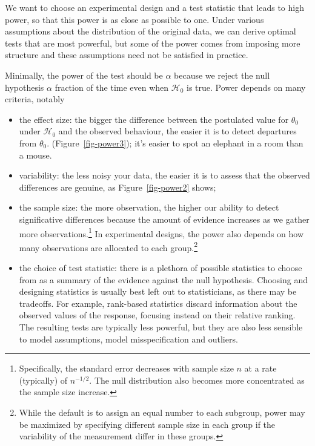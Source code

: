 \documentclass[
  11pt,
  letterpaper,
]{scrbook}
\providecommand{\tightlist}{%
  \setlength{\itemsep}{0pt}\setlength{\parskip}{0pt}}\usepackage{longtable,booktabs,array}
\theoremstyle{definition}
\theoremstyle{remark}
\begin{document}
We want to choose an experimental design and a test statistic that leads
to high power, so that this power is as close as possible to one. Under
various assumptions about the distribution of the original data, we can
derive optimal tests that are most powerful, but some of the power comes
from imposing more structure and these assumptions need not be satisfied
in practice.

Minimally, the power of the test should be \(\alpha\) because we reject
the null hypothesis \(\alpha\) fraction of the time even when
\(\mathscr{H}_0\) is true. Power depends on many criteria, notably

\begin{itemize}
\tightlist
\item
  the effect size: the bigger the difference between the postulated
  value for \(\theta_0\) under \(\mathscr{H}_0\) and the observed
  behaviour, the easier it is to detect departures from \(\theta_0\).
  (Figure~\ref{fig-power3}); it's easier to spot an elephant in a room
  than a mouse.
\item
  variability: the less noisy your data, the easier it is to assess that
  the observed differences are genuine, as Figure~\ref{fig-power2}
  shows;
\item
  the sample size: the more observation, the higher our ability to
  detect significative differences because the amount of evidence
  increases as we gather more observations.\footnote{Specifically, the
    standard error decreases with sample size \(n\) at a rate
    (typically) of \(n^{-1/2}\). The null distribution also becomes more
    concentrated as the sample size increase.} In experimental designs,
  the power also depends on how many observations are allocated to each
  group.\footnote{While the default is to assign an equal number to each
    subgroup, power may be maximized by specifying different sample size
    in each group if the variability of the measurement differ in these
    groups.}
\item
  the choice of test statistic: there is a plethora of possible
  statistics to choose from as a summary of the evidence against the
  null hypothesis. Choosing and designing statistics is usually best
  left out to statisticians, as there may be tradeoffs. For example,
  rank-based statistics discard information about the observed values of
  the response, focusing instead on their relative ranking. The
  resulting tests are typically less powerful, but they are also less
  sensible to model assumptions, model misspecification and outliers.
\end{itemize}
\end{document}
